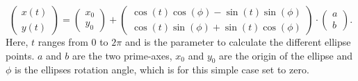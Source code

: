 \begin{equation}\label{paramell}
		\begin{pmatrix} x(t)\\ y(t) \end{pmatrix} = 
		\begin{pmatrix} x_{0} \\ y_{0} \end{pmatrix} +
		\begin{pmatrix} \cos(t)\cos(\phi)-\sin(t)\sin(\phi)\\ \cos(t)\sin(\phi) + \sin(t)\cos(\phi)\end{pmatrix} \cdot
		\begin{pmatrix} a\\b \end{pmatrix}.
\end{equation}
Here, $t$ ranges from $0$ to $2\pi$ and is the parameter to calculate the different ellipse points. $a$ and $b$ are the two prime-axes, $x_{0}$ and $y_{0}$ are the origin of the ellipse and $\phi$ is the ellipses rotation angle, which is for this simple case set to zero.\\

